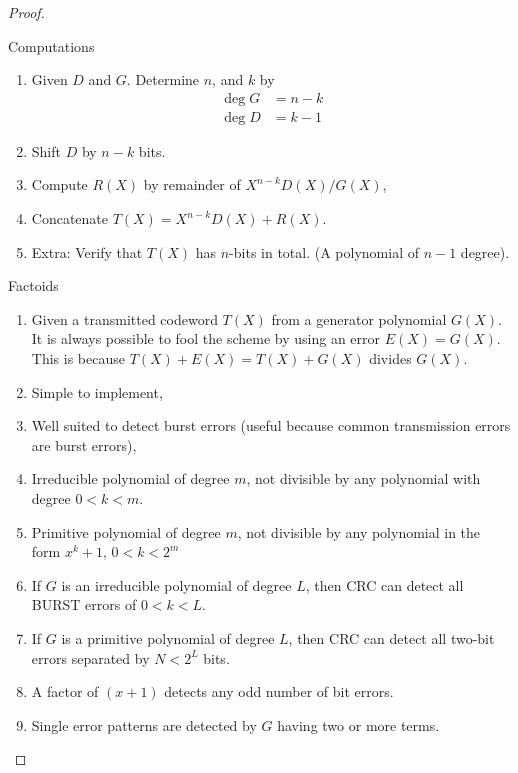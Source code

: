 \documentclass[../../main.tex]{subfiles}
\begin{document}
\begin{proof}
\begin{wtr}
    Computations
    \begin{enumerate}
        \item Given $D$ and $G$. Determine $n$, and $k$ by
        \begin{align}
            \deg{G} &=n-k\\
            \deg{D} &= k-1
        \end{align}
        \item Shift $D$ by $n-k$ bits.
        \item Compute $R(X)$ by remainder of $X^{n-k}D(X)/G(X)$,
        \item Concatenate $T(X) = X^{n-k}D(X) + R(X)$.
        \item Extra: Verify that $T(X)$ has $n$-bits in total. (A polynomial of $n-1$ degree).
    \end{enumerate}
    Factoids
    \begin{enumerate}
        \item Given a transmitted codeword $T(X)$ from a generator polynomial $G(X)$. It is always possible to fool the scheme by using an error $E(X) = G(X)$. This is because $T(X)+E(X) = T(X) + G(X)$ divides $G(X)$.
        \item Simple to implement,
        \item Well suited to detect burst errors (useful because common transmission errors are burst errors),
        \item Irreducible polynomial of degree $m$, not divisible by any polynomial with degree $0<k<m$.
        \item Primitive polynomial of degree $m$, not divisible by any polynomial in the form $x^k + 1$, $0<k<2^m$
        \item If $G$ is an irreducible polynomial of degree $L$, then CRC can detect all BURST errors of $0<k<L$.
        \item If $G$ is a primitive polynomial of degree $L$, then CRC can detect all two-bit errors separated by $N<2^L$ bits.
        \item A factor of $(x+1)$ detects any odd number of bit errors.
        \item Single error patterns are detected by $G$ having two or more terms.
    \end{enumerate}
\end{wtr}
\end{proof}
\end{document}
